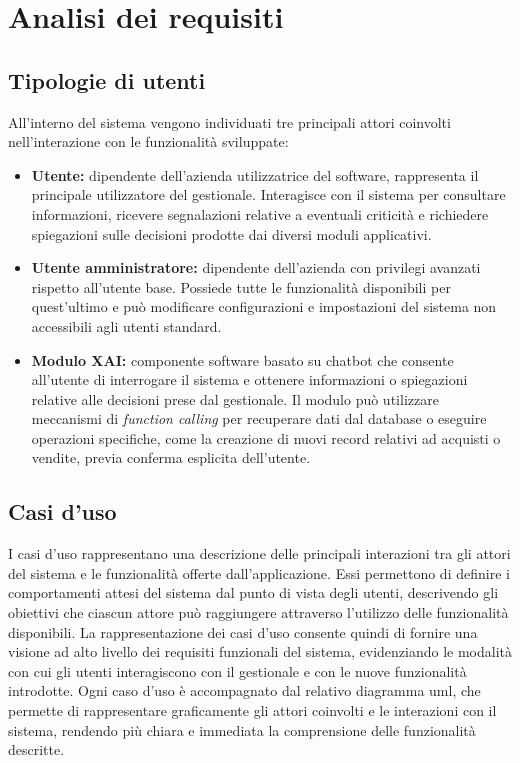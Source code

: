 \chapter{Analisi dei requisiti}
\label{chap:analisi-requisiti}

\section{Tipologie di utenti}

All'interno del sistema vengono individuati tre principali attori coinvolti nell'interazione con le funzionalità sviluppate:

\begin{itemize}
    \item \textbf{Utente:} dipendente dell'azienda utilizzatrice del software, rappresenta il principale utilizzatore del gestionale. 
    Interagisce con il sistema per consultare informazioni, ricevere segnalazioni relative a eventuali criticità e richiedere spiegazioni sulle decisioni prodotte 
    dai diversi moduli applicativi.

    \item \textbf{Utente amministratore:} dipendente dell'azienda con privilegi avanzati rispetto all'utente base. Possiede tutte le funzionalità disponibili per quest'ultimo 
    e può modificare configurazioni e impostazioni del sistema non accessibili agli utenti standard.

    \item \textbf{Modulo XAI:} componente software basato su chatbot che consente all'utente di interrogare il sistema e ottenere informazioni o spiegazioni 
    relative alle decisioni prese dal gestionale. Il modulo può utilizzare meccanismi di \textit{function calling} per recuperare dati dal database o eseguire 
    operazioni specifiche, come la creazione di nuovi record relativi ad acquisti o vendite, previa conferma esplicita dell'utente.
\end{itemize}


\section{Casi d'uso}
I casi d'uso rappresentano una descrizione delle principali interazioni tra gli attori del sistema e le funzionalità offerte dall'applicazione. Essi permettono di 
definire i comportamenti attesi del sistema dal punto di vista degli utenti, descrivendo gli obiettivi che ciascun attore può raggiungere attraverso l'utilizzo delle 
funzionalità disponibili.
\newline
La rappresentazione dei casi d'uso consente quindi di fornire una visione ad alto livello dei requisiti funzionali del sistema, evidenziando le modalità con cui gli utenti 
interagiscono con il gestionale e con le nuove funzionalità introdotte.
\newline
Ogni caso d'uso è accompagnato dal relativo diagramma \gls{uml}, che permette di rappresentare graficamente gli attori coinvolti e le interazioni con il sistema, rendendo più 
chiara e immediata la comprensione delle funzionalità descritte.


